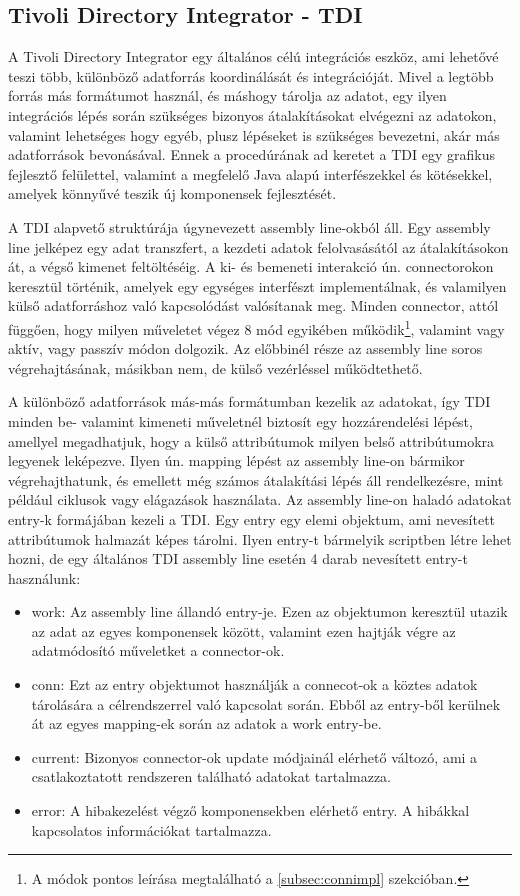 \subsection{Tivoli Directory Integrator - TDI}
\label{subsec:TDI}
A Tivoli Directory Integrator egy általános célú integrációs eszköz, ami lehetővé teszi több, különböző adatforrás koordinálását és integrációját.\cite{tdidoc} Mivel a legtöbb forrás más formátumot használ, és máshogy tárolja az adatot, egy ilyen integrációs lépés során szükséges bizonyos átalakításokat elvégezni az adatokon, valamint lehetséges hogy egyéb, plusz lépéseket is szükséges bevezetni, akár más adatforrások bevonásával. Ennek a procedúrának ad keretet a TDI egy grafikus fejlesztő felülettel, valamint a megfelelő Java alapú interfészekkel és kötésekkel, amelyek könnyűvé teszik új komponensek fejlesztését.

A TDI alapvető struktúrája úgynevezett assembly line-okból áll. Egy assembly line jelképez egy adat transzfert, a kezdeti adatok felolvasásától az átalakításokon át, a végső kimenet feltöltéséig. A ki- és bemeneti interakció ún. connectorokon keresztül történik, amelyek egy egységes interfészt implementálnak, és valamilyen külső adatforráshoz való kapcsolódást valósítanak meg. Minden connector, attól függően, hogy milyen műveletet végez 8 mód egyikében működik\footnote{A módok pontos leírása megtalálható a \ref{subsec:connimpl} szekcióban.}, valamint vagy aktív, vagy passzív módon dolgozik. Az előbbinél része az assembly line soros végrehajtásának, másikban nem, de külső vezérléssel működtethető.

A különböző adatforrások más-más formátumban kezelik az adatokat, így TDI minden be- valamint kimeneti műveletnél biztosít egy hozzárendelési lépést, amellyel megadhatjuk, hogy a külső attribútumok milyen belső attribútumokra legyenek leképezve. Ilyen ún. mapping lépést az assembly line-on bármikor végrehajthatunk, és emellett még számos átalakítási lépés áll rendelkezésre, mint például ciklusok vagy elágazások használata. Az assembly line-on haladó adatokat entry-k formájában kezeli a TDI.\cite{tdientry} Egy entry egy elemi objektum, ami nevesített attribútumok halmazát képes tárolni. Ilyen entry-t bármelyik scriptben létre lehet hozni, de egy általános TDI assembly line esetén 4 darab nevesített entry-t használunk:

\begin{itemize}
	\item work: Az assembly line állandó entry-je. Ezen az objektumon keresztül utazik az adat az egyes komponensek között, valamint ezen hajtják végre az adatmódosító műveletket a connector-ok.
	\item conn: Ezt az entry objektumot használják a connecot-ok a köztes adatok tárolására a célrendszerrel való kapcsolat során. Ebből az entry-ből kerülnek át az egyes mapping-ek során az adatok a work entry-be.
	\item current: Bizonyos connector-ok update módjainál elérhető változó, ami a csatlakoztatott rendszeren található adatokat tartalmazza.
	\item error: A hibakezelést végző komponensekben elérhető entry. A hibákkal kapcsolatos információkat tartalmazza.
\end{itemize}

